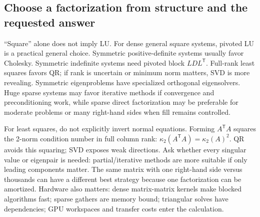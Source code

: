 \subsection{Choose a factorization from structure and the requested answer}\label{choose-a-factorization-from-structure-and-the-requested-answer}

``Square'' alone does not imply LU. For dense general square systems, pivoted LU is a practical general choice. Symmetric positive-definite systems usually favor Cholesky. Symmetric indefinite systems need pivoted block \(LDL^\mathsf T\). Full-rank least squares favors QR; if rank is uncertain or minimum norm matters, SVD is more revealing. Symmetric eigenproblems have specialized orthogonal eigensolvers. Huge sparse systems may favor iterative methods if convergence and preconditioning work, while sparse direct factorization may be preferable for moderate problems or many right-hand sides when fill remains controlled.

For least squares, do not explicitly invert normal equations. Forming \(A^\mathsf TA\) squares the 2-norm condition number in full column rank: \(\kappa_2(A^\mathsf TA)=\kappa_2(A)^2\). QR avoids this squaring; SVD exposes weak directions. Ask whether every singular value or eigenpair is needed: partial/iterative methods are more suitable if only leading components matter. The same matrix with one right-hand side versus thousands can have a different best strategy because one factorization can be amortized. Hardware also matters: dense matrix-matrix kernels make blocked algorithms fast; sparse gathers are memory bound; triangular solves have dependencies; GPU workspaces and transfer costs enter the calculation.

